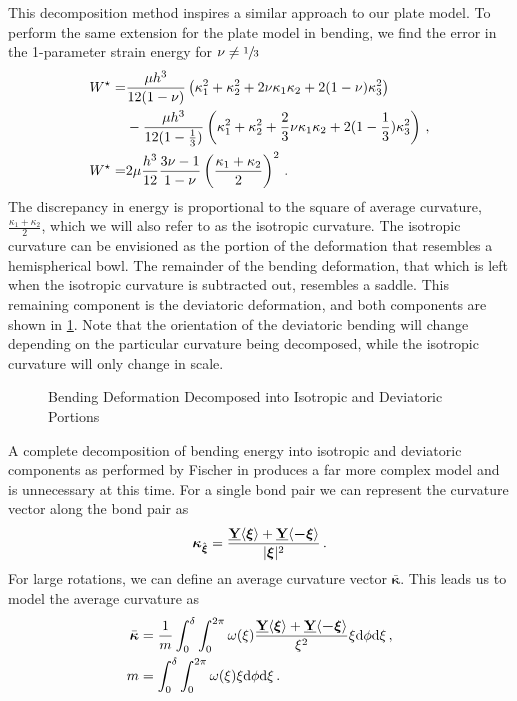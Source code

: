 This decomposition method inspires a similar approach to our plate model. To perform the same extension for the plate model in bending, we find the error in the 1-parameter strain energy for \(\nu \neq \sfrac{1}{3}\)
%
\begin{align}
    W^\star=&\frac{\mu h^3}{12(1-\nu)} \left(\kappa_1^2+\kappa_2^2+2\nu\kappa_1\kappa_2+2(1-\nu)\kappa_3^2 \right)\notag\\
    &-\frac{\mu h^3}{12(1-\frac{1}{3})} \left(\kappa_1^2+\kappa_2^2+\frac{2}{3}\nu\kappa_1\kappa_2+2(1-\frac{1}{3})\kappa_3^2 \right)\, , \notag \\
    W^\star=&2\mu \frac{h^3}{12}\frac{3\nu-1}{1-\nu} \left(\frac{\kappa_1+\kappa_2}{2}\right)^2\, .\notag
\end{align}
%
The discrepancy in energy is proportional to the square of average curvature, \(\frac{\kappa_1+\kappa_2}{2}\), which we will also refer to as the isotropic curvature.  The isotropic curvature can be envisioned as the portion of the deformation that resembles a hemispherical bowl.  The remainder of the bending deformation, that which is left when the isotropic curvature is subtracted out, resembles a saddle. This remaining component is the deviatoric deformation, and both components are shown in \cref{fig:BendingDecomp}. Note that the orientation of the deviatoric bending will change depending on the particular curvature being decomposed, while the isotropic curvature will only change in scale.
%
\begin{figure}[htbp]
  \vspace{5mm}
  \centering
  \resizebox{\linewidth}{!}{}
  \caption{Bending Deformation Decomposed into Isotropic and Deviatoric Portions}
  \label{fig:BendingDecomp}
\end{figure}
%
A complete decomposition of bending energy into isotropic and deviatoric components as performed by Fischer in \cite{fischer1992bending} produces a far more complex model and is unnecessary at this time.  For a single bond pair we can represent the curvature vector along the bond pair as 
%
\begin{equation}
    \boldsymbol{\kappa} _{\hat{\boldsymbol{\xi}}} = \frac{\vstate{Y}{}{\boldsymbol{\xi}}+\vstate{Y}{}{\boldsymbol{-\xi}}}{|\boldsymbol{\xi}|^2}\, .\notag
\end{equation}
%
For large rotations, we can define an average curvature vector \(\bar{\boldsymbol{\kappa}}\).
This leads us to model the average curvature as 
%
\begin{align}
    \bar{\boldsymbol{\kappa}} &= \frac{1}{m} \int_0^\delta \int_0^{2\pi}\omega(\xi)\frac{\vstate{Y}{}{\boldsymbol{\xi}}+\vstate{Y}{}{\boldsymbol{-\xi}}}{\xi^2} \xi {\rm d}\phi {\rm d}\xi \, ,\notag \\
    m &= \int_0^\delta \int_0^{2\pi}\omega(\xi)\xi {\rm d}\phi {\rm d}\xi\, . \notag
\end{align}
